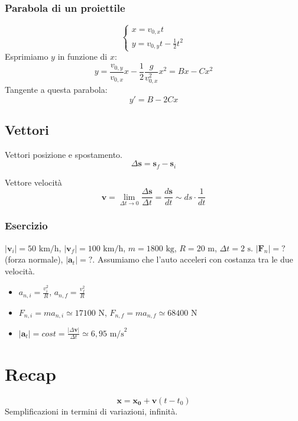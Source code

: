 \subsubsection*{Parabola di un proiettile}
\[
    \begin{cases}
        x = v_{0,x}t\\
        y = v_{0,y}t - \frac{1}{2}t^2
    \end{cases}
\]
Esprimiamo $y$ in funzione di $x$:
\[
    y = \frac{v_{0,y}}{v_{0,x}}x - \frac{1}{2}\frac{g}{v_{0,x}^2}x^2 = Bx - Cx^2
\]
Tangente a questa parabola:
\[
    y' = B - 2Cx
\]

\subsection*{Vettori}
Vettori posizione e spostamento.
\[ \Delta\mathbf{s} = \mathbf{s}_f - \mathbf{s}_i \]

Vettore velocità
\[ \mathbf{v} = \lim_{\Delta t \to 0}\frac{\Delta\mathbf{s}}{\Delta t} = \frac{d\mathbf{s}}{dt} \sim ds\cdot\frac{1}{dt} \]


\subsubsection*{Esercizio}
$|\mathbf{v}_i| = 50\text{ km/h}$, $|\mathbf{v}_f| = 100\text{ km/h}$,
$m = 1800\text{ kg}$, $R = 20\text{ m}$, $\Delta t = 2\text{ s}$. $|\mathbf{F}_n| = ?$ (forza normale),
$|\mathbf{a}_t| = ?$. Assumiamo che l'auto acceleri con costanza tra le
due velocità.

\begin{itemize}
    \item $a_{n,i} = \frac{v_i^2}{R}$, $a_{n,f} = \frac{v_f^2}{R}$
    \item $F_{n,i} = ma_{n,i} \simeq 17100 \text{ N}$, $F_{n,f} = ma_{n,f} \simeq 68400\text{ N}$
    \item $|\mathbf{a}_t| = \textit{cost} = \frac{|\Delta\mathbf{v}|}{\Delta t} \simeq 6,95\text{ m/s}^2$
\end{itemize}

\section*{Recap}
\[ \mathbf{x} = \mathbf{x_0} + \mathbf{v}(t - t_0) \]
Semplificazioni in termini di variazioni, infinità.